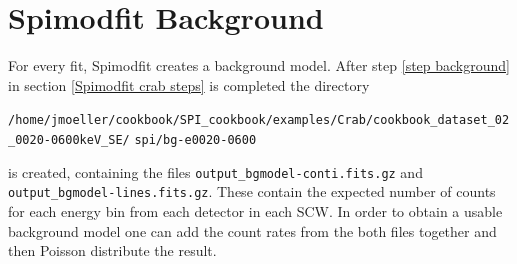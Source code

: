 \documentclass{report}
\begin{document}
\section{Spimodfit Background} \label{spimodfit bkg}
For every fit, Spimodfit creates a background model. After step \ref{step background} in section \ref{Spimodfit crab steps} is completed the directory

\verb|/home/jmoeller/cookbook/SPI_cookbook/examples/Crab/cookbook_dataset_02_0020-0600keV_SE/|\newline
\verb|spi/bg-e0020-0600|

is created, containing the files \verb|output_bgmodel-conti.fits.gz| and \verb|output_bgmodel-lines.fits.gz|. These contain the expected number of counts for each energy bin from each detector in each SCW. In order to obtain a usable background model one can add the count rates from the both files together and then Poisson distribute the result.

\nocite{*}
\printbibliography
\end{document}
